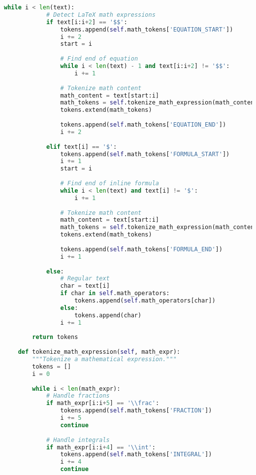 \begin{lstlisting}[language=Python, caption=Mathematical formula tokenization system]
        while i < len(text):
            # Detect LaTeX math expressions
            if text[i:i+2] == '$$':
                tokens.append(self.math_tokens['EQUATION_START'])
                i += 2
                start = i
                
                # Find end of equation
                while i < len(text) - 1 and text[i:i+2] != '$$':
                    i += 1
                
                # Tokenize math content
                math_content = text[start:i]
                math_tokens = self.tokenize_math_expression(math_content)
                tokens.extend(math_tokens)
                
                tokens.append(self.math_tokens['EQUATION_END'])
                i += 2
                
            elif text[i] == '$':
                tokens.append(self.math_tokens['FORMULA_START'])
                i += 1
                start = i
                
                # Find end of inline formula
                while i < len(text) and text[i] != '$':
                    i += 1
                
                # Tokenize math content
                math_content = text[start:i]
                math_tokens = self.tokenize_math_expression(math_content)
                tokens.extend(math_tokens)
                
                tokens.append(self.math_tokens['FORMULA_END'])
                i += 1
                
            else:
                # Regular text
                char = text[i]
                if char in self.math_operators:
                    tokens.append(self.math_operators[char])
                else:
                    tokens.append(char)
                i += 1
        
        return tokens
    
    def tokenize_math_expression(self, math_expr):
        """Tokenize a mathematical expression."""
        tokens = []
        i = 0
        
        while i < len(math_expr):
            # Handle fractions
            if math_expr[i:i+5] == '\\frac':
                tokens.append(self.math_tokens['FRACTION'])
                i += 5
                continue
            
            # Handle integrals
            if math_expr[i:i+4] == '\\int':
                tokens.append(self.math_tokens['INTEGRAL'])
                i += 4
                continue
            

\end{lstlisting}
